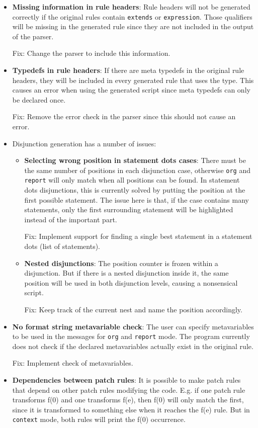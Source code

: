 \begin{itemize}
\item \textbf{Missing information in rule headers}: Rule headers will not be generated correctly if the original rules contain \texttt{extends} or \texttt{expression}. Those qualifiers will be missing in the generated rule since they are not included in the output of the parser.

Fix: Change the parser to include this information.
\item \textbf{Typedefs in rule headers}: If there are meta typedefs in the original rule headers, they will be included in every generated rule that uses the type. This causes an error when using the generated script since meta typedefs can only be declared once.

Fix: Remove the error check in the parser since this should not cause an error.
\item Disjunction generation has a number of issues:
\begin{itemize}
  \item \textbf{Selecting wrong position in statement dots cases}: There must be the same number of positions in each disjunction case, otherwise \texttt{org} and \texttt{report} will only match when all positions can be found. In statement dots disjunctions, this is currently solved by putting the position at the first possible statement. The issue here is that, if the case contains many statements, only the first surrounding statement will be highlighted instead of the important part.

Fix: Implement support for finding a single best statement in a statement dots (list of statements).
  \item \textbf{Nested disjunctions}: The position counter is frozen within a disjunction. But if there is a nested disjunction inside it, the same position will be used in both disjunction levels, causing a nonsensical script.

Fix: Keep track of the current nest and name the position accordingly.
\end{itemize}
\item \textbf{No format string metavariable check}: The user can specify metavariables to be used in the messages for \texttt{org} and \texttt{report} mode. The program currently does not check if the declared metavariables actually exist in the original rule.

Fix: Implement check of metavariables.
\item \textbf{Dependencies between patch rules}: It is possible to make patch rules that depend on other patch rules modifying the code. E.g. if one patch rule transforms f(0) and one transforms f(e), then f(0) will only match the first, since it is transformed to something else when it reaches the f(e) rule. But in \texttt{context} mode, both rules will print the f(0) occurrence.


\end{itemize}
